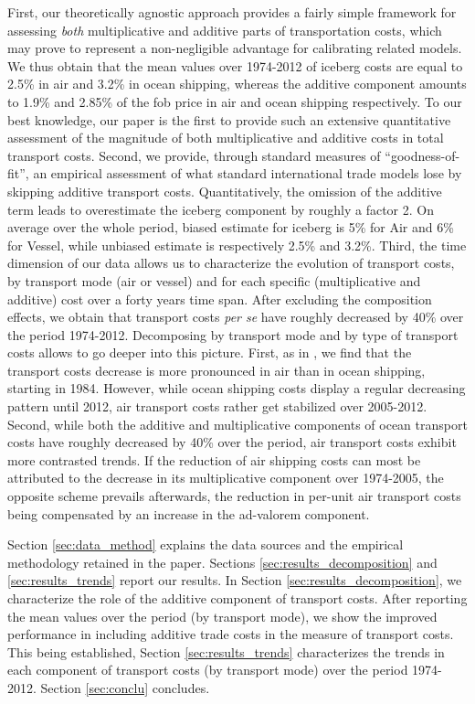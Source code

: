 \documentclass[a4paper,11pt]{article}
\begin{document}
First, our theoretically agnostic approach provides a fairly simple framework for assessing \emph{both} multiplicative and additive parts of transportation costs, which may prove to represent a non-negligible advantage for calibrating related models. We thus obtain that the mean values over 1974-2012 of iceberg costs are equal to 2.5\% in air and 3.2\% in ocean shipping, whereas the additive component amounts to 1.9\% and 2.85\% of the fob price in air and ocean shipping respectively. To our best knowledge, our paper is the first to provide such an extensive quantitative assessment of the magnitude of both multiplicative and additive costs in total transport costs. Second, we provide, through standard measures of ``goodness-of-fit'', an empirical assessment of what standard international trade models lose by skipping additive transport costs. Quantitatively, the omission of the additive term leads to overestimate the iceberg component by roughly a factor 2. On average over the whole period, biased estimate for iceberg is 5\% for Air and 6\% for Vessel, while unbiased estimate is respectively 2.5\% and 3.2\%. Third, the time dimension of our data allows us to characterize the evolution of transport costs, by transport mode (air or vessel) and for each specific (multiplicative and additive) cost over a forty years time span. After excluding the composition effects, we obtain that transport costs \textit{per se} have roughly decreased by 40\% over the period 1974-2012. Decomposing by transport mode and by type of transport costs allows to go deeper into this picture. First, as in \cite{hummels2007}, we find that the transport costs decrease is more pronounced in air than in ocean shipping, starting in 1984. However, while ocean shipping costs display a regular decreasing pattern until 2012, air transport costs rather get stabilized over 2005-2012. Second, while both the additive and multiplicative components of ocean transport costs have roughly decreased by 40\% over the period, air transport costs exhibit more contrasted trends. If the reduction of air shipping costs can most be attributed to the decrease in its multiplicative component over 1974-2005, the opposite scheme prevails afterwards, the reduction in per-unit air transport costs being compensated by an increase in the ad-valorem component. \smallskip


Section \ref{sec:data_method} explains the data sources and the empirical methodology retained in the paper. Sections \ref{sec:results_decomposition} and \ref{sec:results_trends} report our results. In Section \ref{sec:results_decomposition}, we characterize the role of the additive component of transport costs. After reporting the mean values over the period (by transport mode), we show the improved performance in including additive trade costs in the measure of transport costs. This being established, Section \ref{sec:results_trends} characterizes the trends in each component of transport costs (by transport mode) over the period 1974-2012. Section \ref{sec:conclu} concludes.
\end{document}
